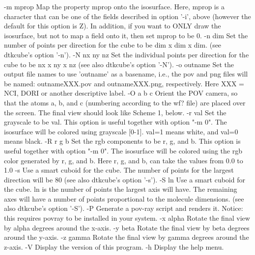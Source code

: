   -m mprop  	Map the property mprop onto the isosurface. Here,
            	  mprop is a character that can be one of the fields
            	  described in option '-i', above (however the default
            	  for this option is Z). In addition, if you want to ONLY draw
            	  the isosurface, but not to map a field onto it, then
            	  set mprop to be 0.
  -n  dim   	Set the number of points per direction for the cube
            	  to be dim x dim x dim. (see dtkcube's option '-n').
  -N nx ny nz	Set the individual points per direction for the cube
            	  to be nx x ny x nz (see also dtkcube's option '-N').
  -o outname	Set the output file names to use 'outname' as a basename,
            	  i.e., the pov and png files will be named:
            	  outnameXXX.pov and outnameXXX.png, respectively. Here
            	  XXX = NCI, DORI or another descriptive label.
  -O a b c  	Orient the POV camera, so that the atoms a, b, and c (numbering
            	  according to the wf? file) are placed over the screen. The
            	  final view should look like Scheme 1, below.
  -r val    	Set the grayscale to be val. This option is useful together
            	  with option "-m 0". The isosurface will be colored using
            	  grayscale [0-1]. val=1 means white, and val=0 means black.
  -R r g b  	Set the rgb components to be r, g, and b. This option is useful together
            	  with option "-m 0". The isosurface will be colored using
            	  the rgb color generated by r, g, and b. Here r, g, and b, can
            	  take the values from 0.0 to 1.0
  -s        	Use a smart cuboid for the cube. The number of points for the
            	  largest direction will be 80
            	  (see also dtkcube's option '-s').
  -S ln     	Use a smart cuboid for the cube. ln is the number of points
            	  the largest axis will have. The remaining axes will have
            	  a number of points proportional to the molecule dimensions.
            	  (see also dtkcube's option '-S').
  -P        	Generate a pov-ray script and renders it. Notice: this requires
            	   povray to be installed in your system.
  -x alpha  	Rotate the final view by alpha degrees around the x-axis.
  -y beta   	Rotate the final view by beta  degrees around the y-axis.
  -z gamma  	Rotate the final view by gamma degrees around the z-axis.
  -V        	Display the version of this program.
  -h		Display the help menu.

